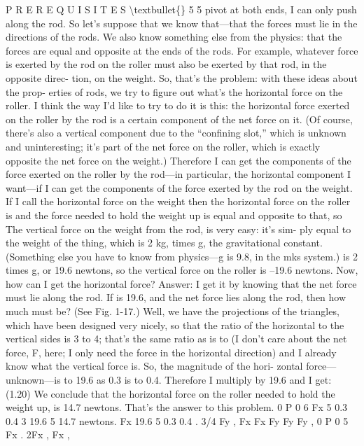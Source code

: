 \documentclass[10pt,oneside]{article}
\begin{document}
P R E R E Q U I S I T E S \textbackslash{}textbullet\{\} 5 5 pivot at both ends, I can only push along the rod. So let’s suppose that we know that---that the forces must lie in the directions of the rods. We also know something else from the physics: that the forces are equal and opposite at the ends of the rods. For example, whatever force is exerted by the rod on the roller must also be exerted by that rod, in the opposite direc- tion, on the weight. So, that’s the problem: with these ideas about the prop- erties of rods, we try to figure out what’s the horizontal force on the roller. I think the way I’d like to try to do it is this: the horizontal force exerted on the roller by the rod is a certain component of the net force on it. (Of course, there’s also a vertical component due to the “confining slot,” which is unknown and uninteresting; it’s part of the net force on the roller, which is exactly opposite the net force on the weight.) Therefore I can get the components of the force exerted on the roller by the rod---in particular, the horizontal component I want---if I can get the components of the force exerted by the rod on the weight. If I call the horizontal force on the weight then the horizontal force on the roller is and the force needed to hold the weight up is equal and opposite to that, so The vertical force on the weight from the rod, is very easy: it’s sim- ply equal to the weight of the thing, which is 2 kg, times g, the gravitational constant. (Something else you have to know from physics---g is 9.8, in the mks system.) is 2 times g, or 19.6 newtons, so the vertical force on the roller is –19.6 newtons. Now, how can I get the horizontal force? Answer: I get it by knowing that the net force must lie along the rod. If is 19.6, and the net force lies along the rod, then how much must be? (See Fig. 1-17.) Well, we have the projections of the triangles, which have been designed very nicely, so that the ratio of the horizontal to the vertical sides is 3 to 4; that’s the same ratio as is to (I don’t care about the net force, F, here; I only need the force in the horizontal direction) and I already know what the vertical force is. So, the magnitude of the hori- zontal force---unknown---is to 19.6 as 0.3 is to 0.4. Therefore I multiply by 19.6 and I get: (1.20) We conclude that the horizontal force on the roller needed to hold the weight up, is 14.7 newtons. That’s the answer to this problem. 0 P 0 6 Fx 5 0.3 0.4 3 19.6 5 14.7 newtons. Fx 19.6 5 0.3 0.4 . 3/4 Fy , Fx Fx Fy Fy Fy , 0 P 0 5 Fx . 2Fx , Fx ,\par
\end{document}
